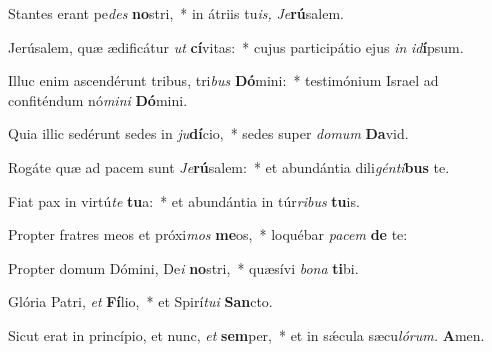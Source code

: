 \item Stantes erant pe\hspace{0.02em}\textit{des} \textbf{no}stri,~* in átriis tu\textit{is,}\hspace{0.02em} \textit{Je}\textbf{rú}salem.
\item Jerúsalem, quæ ædificátur \textit{ut} \textbf{cí}vitas:~* cujus participátio ejus \textit{in} \textit{id}\textbf{í}psum.
\item Illuc enim ascendérunt tribus, tri\textit{bus} \textbf{Dó}mini:~* testimónium Israel ad confiténdum nó\textit{mini} \textbf{Dó}mini.
\item Quia illic sedérunt sedes in \textit{ju}\textbf{dí}cio,~* sedes super \textit{domum} \textbf{Da}vid.
\item Rogáte quæ ad pacem sunt\hspace{0.02em} \textit{Je}\textbf{rú}salem:~* et abundántia dili\textit{génti}\textbf{bus} te.
\item Fiat pax in virtú\textit{te} \textbf{tu}a:~* et abundántia in túr\textit{ribus} \textbf{tu}is.
\item Propter fratres meos et próxi\textit{mos} \textbf{me}os,~* loquébar \textit{pacem} \textbf{de} te:
\item Propter domum Dómini, De\textit{i} \textbf{no}stri,~* quæsívi \textit{bona} \textbf{ti}bi.
\item Glória Patri, \textit{et} \textbf{Fí}lio,~* et Spirí\tinyhspace\textit{tui} \textbf{San}cto.
\item Sicut erat in princípio, et nunc, \textit{et} \textbf{sem}per,~* et in sǽcula sæcu\tinyhspace\textit{lórum.} \textbf{A}men.